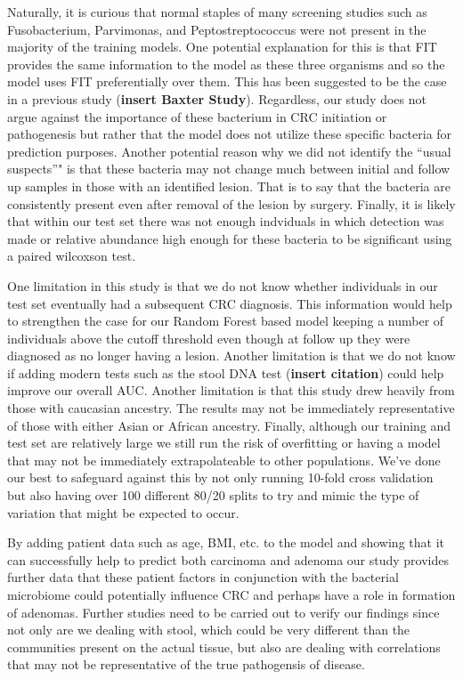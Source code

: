 \documentclass[12pt,]{article}
\begin{document}
Naturally, it is curious that normal staples of many screening studies
such as Fusobacterium, Parvimonas, and Peptostreptococcus were not
present in the majority of the training models. One potential
explanation for this is that FIT provides the same information to the
model as these three organisms and so the model uses FIT preferentially
over them. This has been suggested to be the case in a previous study
(\textbf{insert Baxter Study}). Regardless, our study does not argue
against the importance of these bacterium in CRC initiation or
pathogenesis but rather that the model does not utilize these specific
bacteria for prediction purposes. Another potential reason why we did
not identify the ``usual suspects''" is that these bacteria may not
change much between initial and follow up samples in those with an
identified lesion. That is to say that the bacteria are consistently
present even after removal of the lesion by surgery. Finally, it is
likely that within our test set there was not enough indviduals in which
detection was made or relative abundance high enough for these bacteria
to be significant using a paired wilcoxson test.

One limitation in this study is that we do not know whether individuals
in our test set eventually had a subsequent CRC diagnosis. This
information would help to strengthen the case for our Random Forest
based model keeping a number of individuals above the cutoff threshold
even though at follow up they were diagnosed as no longer having a
lesion. Another limitation is that we do not know if adding modern tests
such as the stool DNA test (\textbf{insert citation}) could help improve
our overall AUC. Another limitation is that this study drew heavily from
those with caucasian ancestry. The results may not be immediately
representative of those with either Asian or African ancestry. Finally,
although our training and test set are relatively large we still run the
risk of overfitting or having a model that may not be immediately
extrapolateable to other populations. We've done our best to safeguard
against this by not only running 10-fold cross validation but also
having over 100 different 80/20 splits to try and mimic the type of
variation that might be expected to occur.

By adding patient data such as age, BMI, etc. to the model and showing
that it can successfully help to predict both carcinoma and adenoma our
study provides further data that these patient factors in conjunction
with the bacterial microbiome could potentially influence CRC and
perhaps have a role in formation of adenomas. Further studies need to be
carried out to verify our findings since not only are we dealing with
stool, which could be very different than the communities present on the
actual tissue, but also are dealing with correlations that may not be
representative of the true pathogensis of disease.
\end{document}
